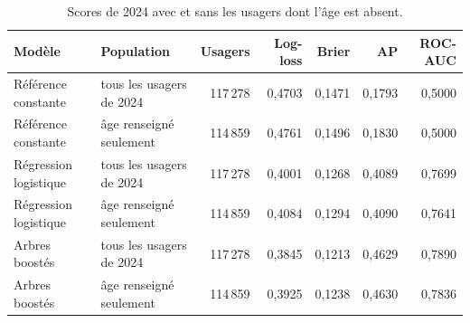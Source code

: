 \begin{table}[htbp]
\centering\small
\renewcommand{\arraystretch}{1.18}
\caption{Scores de 2024 avec et sans les usagers dont l'âge est absent.}\label{tab:ages-impact}
\begin{tabularx}{\textwidth}{@{}LLrrrrr@{}}
\toprule
Modèle & Population & Usagers & Log-loss & Brier & AP & ROC-AUC \\
\midrule
Référence constante & tous les usagers de 2024 & 117\,278 & 0,4703 & 0,1471 & 0,1793 & 0,5000 \\
Référence constante & âge renseigné seulement & 114\,859 & 0,4761 & 0,1496 & 0,1830 & 0,5000 \\
Régression logistique & tous les usagers de 2024 & 117\,278 & 0,4001 & 0,1268 & 0,4089 & 0,7699 \\
Régression logistique & âge renseigné seulement & 114\,859 & 0,4084 & 0,1294 & 0,4090 & 0,7641 \\
Arbres boostés & tous les usagers de 2024 & 117\,278 & 0,3845 & 0,1213 & 0,4629 & 0,7890 \\
Arbres boostés & âge renseigné seulement & 114\,859 & 0,3925 & 0,1238 & 0,4630 & 0,7836 \\
\bottomrule
\end{tabularx}
\end{table}
